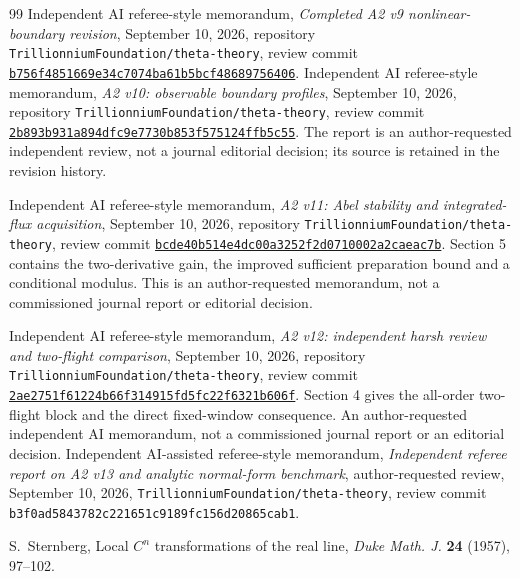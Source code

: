 \begin{thebibliography}{99}
Independent AI referee-style memorandum, \emph{Completed A2 v9
nonlinear-boundary revision}, September 10, 2026, repository
\texttt{TrillionniumFoundation/theta-theory}, review commit
\href{https://github.com/TrillionniumFoundation/theta-theory/commit/b756f4851669e34c7074ba61b5bcf48689756406}{\texttt{b756f4851669e34c7074ba61b5bcf48689756406}}.
Independent AI referee-style memorandum, \emph{A2 v10: observable
boundary profiles}, September 10, 2026, repository
\texttt{TrillionniumFoundation/theta-theory}, review commit
\href{https://github.com/TrillionniumFoundation/theta-theory/commit/2b893b931a894dfc9e7730b853f575124ffb5c55}{\texttt{2b893b931a894dfc9e7730b853f575124ffb5c55}}.
The report is an author-requested independent review, not a journal
editorial decision; its source is retained in the revision history.

Independent AI referee-style memorandum, \emph{A2 v11: Abel stability
and integrated-flux acquisition}, September 10, 2026, repository
\texttt{TrillionniumFoundation/theta-theory}, review commit
\href{https://github.com/TrillionniumFoundation/theta-theory/commit/bcde40b514e4dc00a3252f2d0710002a2caeac7b}{\texttt{bcde40b514e4dc00a3252f2d0710002a2caeac7b}}.
Section 5 contains the two-derivative gain, the improved sufficient
preparation bound and a conditional modulus. This is an author-requested
memorandum, not a commissioned journal report or editorial decision.

Independent AI referee-style memorandum, \emph{A2 v12: independent
harsh review and two-flight comparison}, September 10, 2026, repository
\texttt{TrillionniumFoundation/theta-theory}, review commit
\href{https://github.com/TrillionniumFoundation/theta-theory/commit/2ae2751f61224b66f314915fd5fc22f6321b606f}{\texttt{2ae2751f61224b66f314915fd5fc22f6321b606f}}.
Section 4 gives the all-order two-flight block and the direct fixed-window
consequence. An author-requested independent AI memorandum, not a
commissioned journal report or an editorial decision.
Independent AI-assisted referee-style memorandum,
\emph{Independent referee report on A2 v13 and analytic normal-form
benchmark}, author-requested review, September 10, 2026,
\texttt{TrillionniumFoundation/theta-theory},
review commit \texttt{b3f0ad5843782c221651c9189fc156d20865cab1}.

S.~Sternberg, Local $C^n$ transformations of the real line,
\emph{Duke Math. J.} \textbf{24} (1957), 97--102.


\end{thebibliography}
